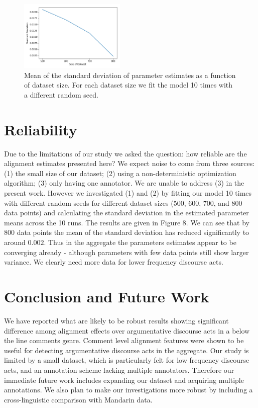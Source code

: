 \documentclass[11pt,a4paper]{article}
\begin{document}
\begin{figure}[t]
\centering
\includegraphics[width=0.45\textwidth]{std.png}
\caption{Mean of the standard deviation of parameter estimates as a function of dataset size. For each dataset size we fit the model 10 times with a different random seed.}
\end{figure}

\section{Reliability}

Due to the limitations of our study we asked the question: how reliable are the alignment estimates presented here? We expect noise to come from three sources: (1) the small size of our dataset; (2) using a non-deterministic optimization algorithm; (3) only having one annotator. We are unable to address (3) in the present work. However we investigated (1) and (2) by fitting our model 10 times with different random seeds for different dataset sizes (500, 600, 700, and 800 data points) and calculating the standard deviation in the estimated parameter means across the 10 runs. The results are given in Figure 8. We can see that by 800 data points the mean of the standard deviation has reduced significantly to around $0.002$. Thus in the aggregate the parameters estimates appear to be converging already - although parameters with few data points still show larger variance. We clearly need more data for lower frequency discourse acts.

\section{Conclusion and Future Work}

We have reported what are likely to be robust results showing significant difference among alignment effects over argumentative discourse acts in a below the line comments genre. Comment level alignment features were shown to be useful for detecting argumentative discourse acts in the aggregate. Our study is limited by a small dataset, which is particularly felt for low frequency discourse acts, and an annotation scheme lacking multiple annotators. Therefore our immediate future work includes expanding our dataset and acquiring multiple annotations. We also plan to make our investigations more robust by including a cross-linguistic comparison with Mandarin data.
\end{document}
